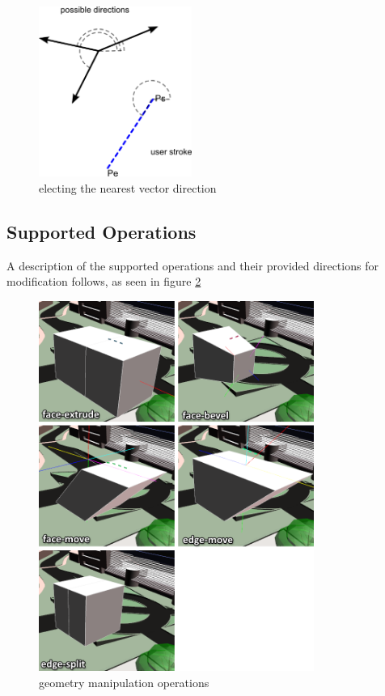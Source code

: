 \begin{figure}[!ht]
	\centering
	\includegraphics[width=5cm]{gfx/election.png}
	\caption{electing the nearest vector direction}
	\label{fig:election}
\end{figure}

\subsection{Supported Operations}

A description of the supported operations and their provided directions for modification follows,
as seen in figure \ref{fig:shots}

\begin{figure}[!ht]
	\centering
	\includegraphics[width=9cm]{gfx/shots2.png}
	\caption{geometry manipulation operations}
	\label{fig:shots}
\end{figure}

